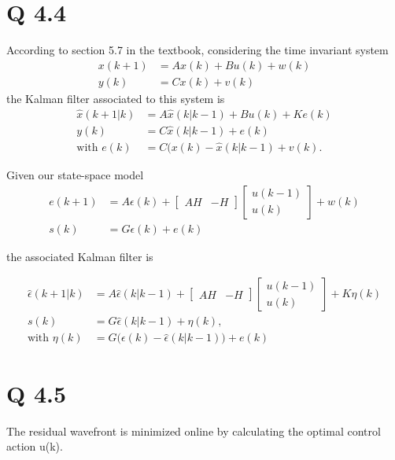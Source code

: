 \documentclass[11pt, oneside,a4paper,fleqn]{report}
\begin{document}
\section*{Q 4.4}
According to section 5.7 in the textbook, considering the time invariant system
\begin{align*}
    x(k+1)&=Ax(k)+Bu(k)+w(k)\\
    y(k)&=Cx(k)+v(k)
\end{align*}
the Kalman filter associated to this system is
\begin{align*}
    \hat{x}(k+1|k)&=A\hat{x}(k|k-1)+Bu(k)+Ke(k)\\
    y(k)&=C\hat{x}(k|k-1)+e(k)\\
    \text{with }e(k)&=C(x(k)-\hat{x}(k|k-1)+v(k).
\end{align*}

Given our state-space model
\begin{align*}
    e(k+1)&=A\epsilon(k)+ 
        \begin{bmatrix}
            AH & -H 
        \end{bmatrix}
        \begin{bmatrix}
            u(k-1)\\
            u(k)
        \end{bmatrix}
        + w(k)\\
    s(k)&=G\epsilon(k) + e(k)
\end{align*}

the associated Kalman filter is

\begin{align}
    \hat{\epsilon}(k+1|k)&=A\hat{\epsilon}(k|k-1)+
    \begin{bmatrix}
        AH & -H 
    \end{bmatrix}
    \begin{bmatrix}
        u(k-1)\\
        u(k)
    \end{bmatrix}
    +K\eta(k)\\
    s(k)&=G\hat{\epsilon}(k|k-1)+\eta(k),\\
    \text{with }\eta(k)&=G\Big(\epsilon(k)-\hat{\epsilon}(k|k-1)\Big)+e(k)
\end{align}

\section*{Q 4.5}
The residual wavefront is minimized online by calculating the optimal control action u(k).
\end{document}
